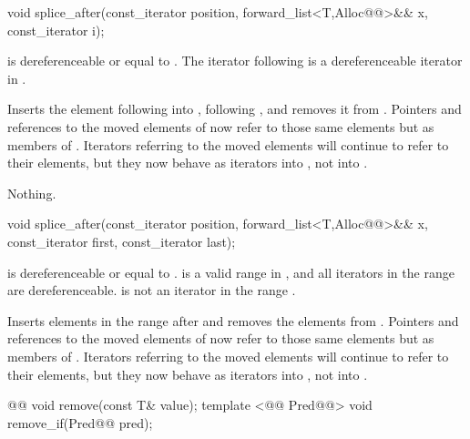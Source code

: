 \documentclass[american,twoside]{book}
\begin{document}
\begin{itemdecl}
void splice_after(const_iterator position, forward_list<T,Alloc@@>&& x, const_iterator i);
\end{itemdecl}

\begin{itemdescr}
\pnum
\requires {} is dereferenceable or equal to . The iterator following  is a dereferenceable iterator in .

\pnum
\effects Inserts the element following  into , following , and removes it from . Pointers and references to the moved elements of  now refer to those same elements but as members of . Iterators referring to the moved elements will continue to refer to their elements, but they now behave as iterators into , not into .

\pnum
\throws Nothing.

\pnum
\complexity {}
\end{itemdescr}

\begin{itemdecl}
void splice_after(const_iterator position, forward_list<T,Alloc@@>&& x, 
                  const_iterator first, const_iterator last);
\end{itemdecl}

\begin{itemdescr}
\pnum
\requires {} is dereferenceable or equal to .  is a valid range in , and all iterators in the range  are dereferenceable.  is not an iterator in the range .

\pnum
\effects Inserts elements in the range  after  and removes the elements from . Pointers and references to the moved elements of  now refer to those same elements but as members of . Iterators referring to the moved elements will continue to refer to their elements, but they now behave as iterators into , not into .
\end{itemdescr}

\begin{itemdecl}
@@ void remove(const T& value);
template <@@ Pred@@> void remove_if(Pred@@ pred);
\end{itemdecl}
\end{document}
